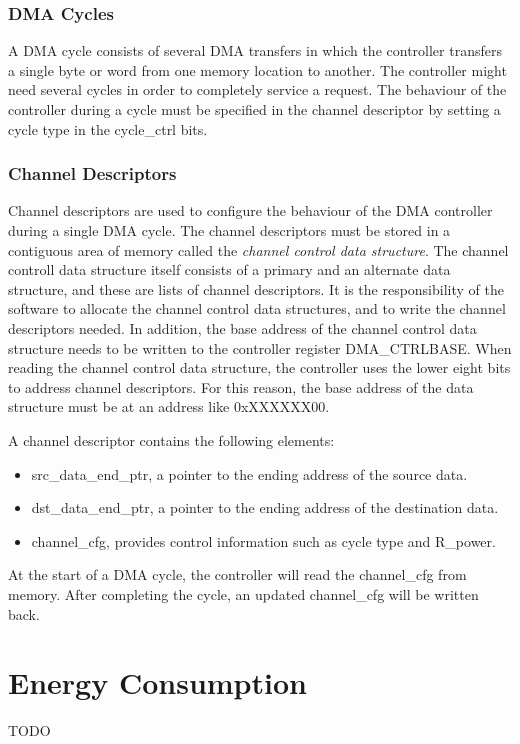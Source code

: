 \subsubsection{DMA Cycles}
A DMA cycle consists of several DMA transfers in which the controller transfers a single byte or word from one memory location to another. The controller might need several cycles in order to completely service a request. The behaviour of the controller during a cycle must be specified in the channel descriptor by setting a cycle type in the cycle\_ctrl bits.

\subsubsection{Channel Descriptors}
Channel descriptors are used to configure the behaviour of the DMA controller during a single DMA cycle. The channel descriptors must be stored in a contiguous area of memory called the \emph{channel control data structure}. The channel controll data structure itself consists of a primary and an alternate data structure, and these are lists of channel descriptors. It is the responsibility of the software to allocate the channel control data structures, and to write the channel descriptors needed. In addition, the base address of the channel control data structure needs to be written to the controller register DMA\_CTRLBASE. When reading the channel control data structure, the controller uses the lower eight bits to address channel descriptors. For this reason, the base address of the data structure must be at an address like 0xXXXXXX00.

A channel descriptor contains the following elements:
\begin{itemize}
	\item src\_data\_end\_ptr, a pointer to the ending address of the source data.
	\item dst\_data\_end\_ptr, a pointer to the ending address of the destination data.
	\item channel\_cfg, provides control information such as cycle type and R\_power.
\end{itemize}
At the start of a DMA cycle, the controller will read the channel\_cfg from memory. After completing the cycle, an updated channel\_cfg will be written back.



\section{Energy Consumption}
TODO %

